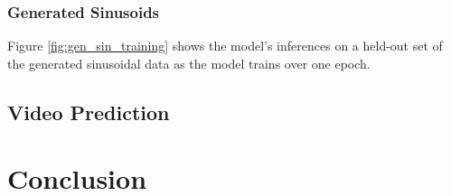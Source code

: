 \documentclass{scrartcl}
\begin{document}
\subsubsection{Generated Sinusoids}
\label{subsubsec:generated_sins}

Figure \ref{fig:gen_sin_training} shows the model's inferences on a held-out
set of the generated sinusoidal data as the model trains over one epoch. 

\subsection{Video Prediction}
\label{subsec:experiment_vp}

\newpage
\section{Conclusion}
\label{sec:conclusion}


\newpage

\newpage
\end{document}

